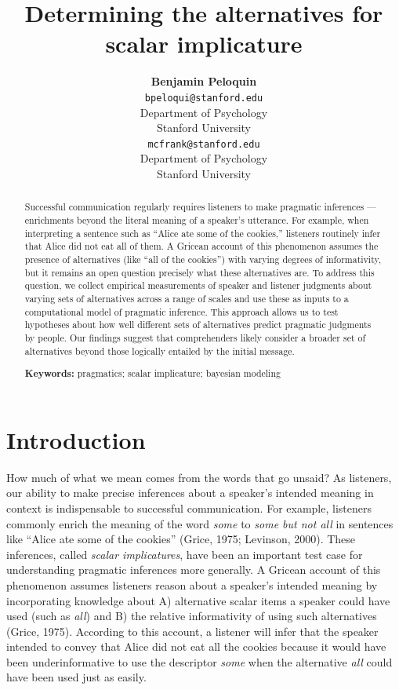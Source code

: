 \documentclass[10pt, letterpaper]{article}
\title{Determining the alternatives for scalar implicature}
\author{{\large \bf Benjamin Peloquin} \\ \texttt{bpeloqui@stanford.edu} \\ Department of Psychology \\ Stanford University \And {\large \bf Michael C. Frank} \\ \texttt{mcfrank@stanford.edu} \\ Department of Psychology \\ Stanford University}
\begin{document}
\maketitle

\begin{abstract}
Successful communication regularly requires listeners to make pragmatic
inferences --- enrichments beyond the literal meaning of a speaker's
utterance. For example, when interpreting a sentence such as ``Alice ate
some of the cookies,'' listeners routinely infer that Alice did not eat
all of them. A Gricean account of this phenomenon assumes the presence
of alternatives (like ``all of the cookies'') with varying degrees of
informativity, but it remains an open question precisely what these
alternatives are. To address this question, we collect empirical
measurements of speaker and listener judgments about varying sets of
alternatives across a range of scales and use these as inputs to a
computational model of pragmatic inference. This approach allows us to
test hypotheses about how well different sets of alternatives predict
pragmatic judgments by people. Our findings suggest that comprehenders
likely consider a broader set of alternatives beyond those logically
entailed by the initial message.

\textbf{Keywords:}
pragmatics; scalar implicature; bayesian modeling
\end{abstract}

\section{Introduction}\label{introduction}

How much of what we mean comes from the words that go unsaid? As
listeners, our ability to make precise inferences about a speaker's
intended meaning in context is indispensable to successful
communication. For example, listeners commonly enrich the meaning of the
word \emph{some} to \emph{some but not all} in sentences like ``Alice
ate some of the cookies'' (Grice, 1975; Levinson, 2000). These
inferences, called \emph{scalar implicatures}, have been an important
test case for understanding pragmatic inferences more generally. A
Gricean account of this phenomenon assumes listeners reason about a
speaker's intended meaning by incorporating knowledge about A)
alternative scalar items a speaker could have used (such as \emph{all})
and B) the relative informativity of using such alternatives (Grice,
1975). According to this account, a listener will infer that the speaker
intended to convey that Alice did not eat all the cookies because it
would have been underinformative to use the descriptor \emph{some} when
the alternative \emph{all} could have been used just as easily.
\end{document}
